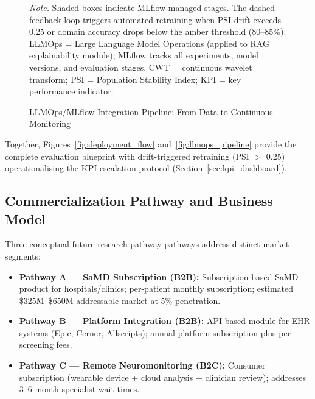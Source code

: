 \begin{figure}[!htbp]
{%
}
\caption[LLMOps/MLflow Integration Pipeline]{LLMOps/MLflow Integration Pipeline: From Data to Continuous Monitoring}
\vspace{0.3em}\noindent\textit{Note.} Shaded boxes indicate MLflow-managed stages. The dashed feedback loop triggers automated retraining when PSI drift exceeds 0.25 or domain accuracy drops below the amber threshold (80--85\%). LLMOps = Large Language Model Operations (applied to RAG explainability module); MLflow tracks all experiments, model versions, and evaluation stages. CWT = continuous wavelet transform; PSI = Population Stability Index; KPI = key performance indicator.
\end{figure}

\noindent Together, Figures~\ref{fig:deployment_flow} and~\ref{fig:llmops_pipeline} provide the complete evaluation blueprint with drift-triggered retraining (PSI $>$ 0.25) operationalising the KPI escalation protocol (Section~\ref{sec:kpi_dashboard}).
\fi

\subsection{Commercialization Pathway and Business Model}

Three conceptual future-research pathway pathways address distinct market segments:

\begin{itemize}[nosep]
    \item \textbf{Pathway A --- SaMD Subscription (B2B):} Subscription-based SaMD product for hospitals/clinics; per-patient monthly subscription; estimated \$325M--\$650M addressable market at 5\% penetration.
    \item \textbf{Pathway B --- Platform Integration (B2B):} API-based module for EHR systems (Epic, Cerner, Allscripts); annual platform subscription plus per-screening fees.
    \item \textbf{Pathway C --- Remote Neuromonitoring (B2C):} Consumer subscription (wearable device + cloud analysis + clinician review); addresses 3--6 month specialist wait times.
\end{itemize}

